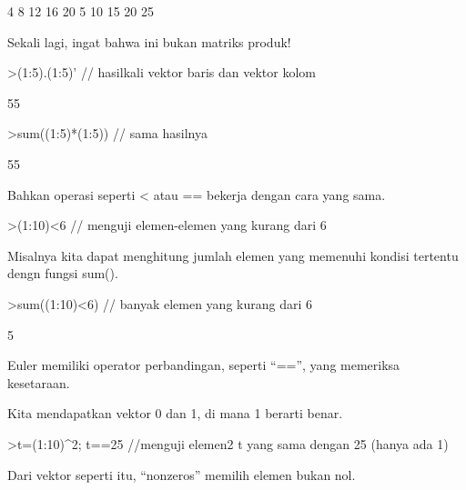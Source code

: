 \documentclass{article}
\begin{document}
\begin{eulernotebook}
\begin{euleroutput}
              4             8            12            16            20 
              5            10            15            20            25 
\end{euleroutput}
\begin{eulercomment}
Sekali lagi, ingat bahwa ini bukan matriks produk!
\end{eulercomment}
\begin{eulerprompt}
>(1:5).(1:5)' // hasilkali vektor baris dan vektor kolom
\end{eulerprompt}
\begin{euleroutput}
  55
\end{euleroutput}
\begin{eulerprompt}
>sum((1:5)*(1:5)) // sama hasilnya
\end{eulerprompt}
\begin{euleroutput}
  55
\end{euleroutput}
\begin{eulercomment}
Bahkan operasi seperti \textless{} atau == bekerja dengan cara yang sama.
\end{eulercomment}
\begin{eulerprompt}
>(1:10)<6 // menguji elemen-elemen yang kurang dari 6
\end{eulerprompt}
\begin{euleroutput}
  [1,  1,  1,  1,  1,  0,  0,  0,  0,  0]
\end{euleroutput}
\begin{eulercomment}
Misalnya kita dapat menghitung jumlah elemen yang memenuhi kondisi
tertentu dengn fungsi sum().
\end{eulercomment}
\begin{eulerprompt}
>sum((1:10)<6) // banyak elemen yang kurang dari 6
\end{eulerprompt}
\begin{euleroutput}
  5
\end{euleroutput}
\begin{eulercomment}
Euler memiliki operator perbandingan, seperti “==”, yang memeriksa
kesetaraan.


Kita mendapatkan vektor 0 dan 1, di mana 1 berarti benar.
\end{eulercomment}
\begin{eulerprompt}
>t=(1:10)^2; t==25 //menguji elemen2 t yang sama dengan 25 (hanya ada 1)
\end{eulerprompt}
\begin{euleroutput}
  [0,  0,  0,  0,  1,  0,  0,  0,  0,  0]
\end{euleroutput}
\begin{eulercomment}
Dari vektor seperti itu, “nonzeros” memilih elemen bukan nol.



\end{eulercomment}
\end{eulernotebook}
\end{document}
